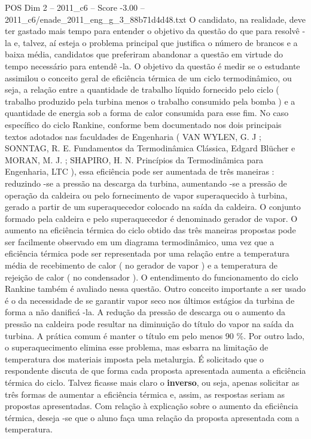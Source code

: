 \begin{textsample}{POS Dim 2 – 2011\_c6 – Score -3.00 – 2011\_c6/enade\_2011\_eng\_g\_3\_88b71d4d48.txt}
O candidato, na realidade, deve ter gastado mais tempo para entender o objetivo da questão do que para resolvê -la e, talvez, aí esteja o problema principal que justifica o número de brancos e a baixa média, candidatos que preferiram abandonar a questão em virtude do tempo necessário para entendê -la.
O objetivo da questão é medir se o estudante assimilou o conceito geral de eficiência térmica de um ciclo termodinâmico, ou seja, a relação entre a quantidade de trabalho líquido fornecido pelo ciclo ( trabalho produzido pela turbina menos o trabalho consumido pela bomba ) e a quantidade de energia sob a forma de calor consumida para esse fim.
No caso específico do ciclo Rankine, conforme bem documentado nos dois principais textos adotados nas faculdades de Engenharia ( VAN WYLEN, G.
J ; SONNTAG, R.
E.
Fundamentos da Termodinâmica Clássica, Edgard Blücher e MORAN, M.
J. ; SHAPIRO, H.
N.
Princípios da Termodinâmica para Engenharia, LTC ), essa eficiência pode ser aumentada de três maneiras : reduzindo -se a pressão na descarga da turbina, aumentando -se a pressão de operação da caldeira ou pelo fornecimento de vapor superaquecido à turbina, gerado a partir de um superaquecedor colocado na saída da caldeira.
O conjunto formado pela caldeira e pelo superaquecedor é denominado gerador de vapor.
O aumento na eficiência térmica do ciclo obtido das três maneiras propostas pode ser facilmente observado em um diagrama termodinâmico, uma vez que a eficiência térmica pode ser representada por uma relação entre a temperatura média de recebimento de calor ( no gerador de vapor ) e a temperatura de rejeição de calor ( no condensador ).
O entendimento do funcionamento do ciclo Rankine também é avaliado nessa questão.
Outro conceito importante a ser usado é o da necessidade de se garantir vapor seco nos últimos estágios da turbina de forma a não danificá -la.
A redução da pressão de descarga ou o aumento da pressão na caldeira pode resultar na diminuição do título do vapor na saída da turbina.
A prática comum é manter o título em pelo menos 90 \%.
Por outro lado, o superaquecimento elimina esse problema, mas esbarra na limitação de temperatura dos materiais imposta pela metalurgia.
É solicitado que o respondente discuta de que forma cada proposta apresentada aumenta a eficiência térmica do ciclo.
Talvez ficasse mais claro o \textbf{inverso}, ou seja, apenas solicitar as três formas de aumentar a eficiência térmica e, assim, as respostas seriam as propostas apresentadas.
Com relação à explicação sobre o aumento da eficiência térmica, deseja -se que o aluno faça uma relação da proposta apresentada com a temperatura.

\end{textsample}
